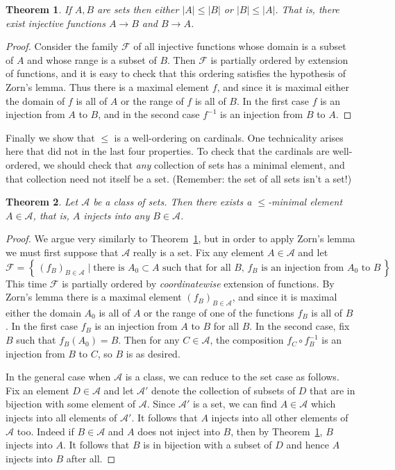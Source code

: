 \documentclass[11pt,oneside,a4paper]{amsbook}
\newcommand{\set}[1]{\left\{\,#1\,\right\}}
\theoremstyle{definition}
\theoremstyle{plain}
\newtheorem{theorem}{Theorem}[section]
\theoremstyle{definition}
\theoremstyle{remark}
\numberwithin{equation}{section}
\numberwithin{figure}{section}
\begin{document}
\begin{theorem}
  \label{thm:card-total}
  If $A,B$ are sets then either $|A|\leq|B|$ or $|B|\leq|A|$. That is, there exist injective functions $A\to B$ and $B\to A$.
\end{theorem}

\begin{proof}
  Consider the family $\mathcal F$ of all injective functions whose domain is a subset of $A$ and whose range is a subset of $B$. Then $\mathcal F$ is partially ordered by extension of functions, and it is easy to check that this ordering satisfies the hypothesis of Zorn's lemma. Thus there is a maximal element $f$, and since it is maximal either the domain of $f$ is all of $A$ or the range of $f$ is all of $B$. In the first case $f$ is an injection from $A$ to $B$, and in the second case $f^{-1}$ is an injection from $B$ to $A$.
\end{proof}

Finally we show that $\leq$ is a well-ordering on cardinals. One technicality arises here that did not in the last four properties. To check that the cardinals are well-ordered, we should check that \emph{any} collection of sets has a minimal element, and that collection need not itself be a set. (Remember: the set of all sets isn't a set!)

\begin{theorem}
  \label{thm:card-well}
  Let $\mathcal A$ be a class of sets. Then there exists a $\leq$-minimal element $A\in\mathcal A$, that is, $A$ injects into any $B\in\mathcal A$.
\end{theorem}

\begin{proof}
  We argue very similarly to Theorem~\ref{thm:card-total}, but in order to apply Zorn's lemma we must first suppose that $\mathcal A$ really is a set. Fix any element $A\in\mathcal A$ and let
  \[\mathcal F=\set{(f_B)_{B\in\mathcal A}\mid\text{there is $A_0\subset A$ such that for all $B$, $f_B$ is an injection from $A_0$ to $B$}}
  \]
  This time $\mathcal F$ is partially ordered by \emph{coordinatewise} extension of functions. By Zorn's lemma there is a maximal element $(f_B)_{B\in\mathcal A}$, and since it is maximal either the domain $A_0$ is all of $A$ or the range of one of the functions $f_B$ is all of $B$. In the first case $f_B$ is an injection from $A$ to $B$ for all $B$. In the second case, fix $B$ such that $f_B(A_0)=B$. Then for any $C\in\mathcal A$, the composition $f_C\circ f_B^{-1}$ is an injection from $B$ to $C$, so $B$ is as desired.

  In the general case when $\mathcal A$ is a class, we can reduce to the set case as follows. Fix an element $D\in\mathcal A$ and let $\mathcal A'$ denote the collection of subsets of $D$ that are in bijection with some element of $\mathcal A$. Since $\mathcal A'$ is a set, we can find $A\in\mathcal A$ which injects into all elements of $\mathcal A'$. It follows that $A$ injects into all other elements of $\mathcal A$ too. Indeed if $B\in\mathcal A$ and $A$ does not inject into $B$, then by Theorem~\ref{thm:card-total}, $B$ injects into $A$. It follows that $B$ is in bijection with a subset of $D$ and hence $A$ injects into $B$ after all.
\end{proof}
\end{document}
